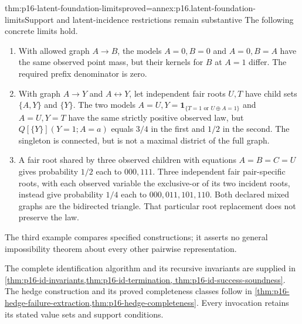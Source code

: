 \begin{hbtheorem}{thm:p16-latent-foundation-limits}{proved=annex:p16.latent-foundation-limits}{Support and latent-incidence restrictions remain substantive}
The following concrete limits hold.
\begin{enumerate}
\item With allowed graph \(A\to B\), the models \(A=0,B=0\)
      and \(A=0,B=A\) have the same observed point mass, but
      their kernels for \(B\) at \(A=1\) differ. The required
      prefix denominator is zero.
\item With graph \(A\to Y\) and \(A\leftrightarrow Y\),
      let independent fair roots \(U,T\) have child sets
      \(\{A,Y\}\) and \(\{Y\}\). The two models
      \(A=U,Y=\mathbf1_{\{T=1\text{ or }U\oplus A=1\}}\)
      and \(A=U,Y=T\) have the same strictly positive observed
      law, but \(Q[\{Y\}](Y=1;A=a)\) equals \(3/4\) in
      the first and \(1/2\) in the second. The singleton is
      connected, but is not a maximal district of the full graph.
\item A fair root shared by three observed children with equations
      \(A=B=C=U\) gives probability \(1/2\) each to
      \(000,111\). Three independent fair pair-specific roots,
      with each observed variable the exclusive-or of its two incident
      roots, instead give probability \(1/4\) each to
      \(000,011,101,110\). Both declared mixed graphs are the
      bidirected triangle. That particular root replacement does
      not preserve the law.
\end{enumerate}
The third example compares specified constructions; it asserts no
general impossibility theorem about every other pairwise representation.
\end{hbtheorem}

The complete identification algorithm and its recursive invariants are
supplied in \cref{thm:p16-id-invariants,thm:p16-id-termination,
thm:p16-id-success-soundness}. The hedge construction and its proved
completeness classes follow in
\cref{thm:p16-hedge-failure-extraction,thm:p16-hedge-completeness}.
Every invocation retains its stated value sets and support conditions.
